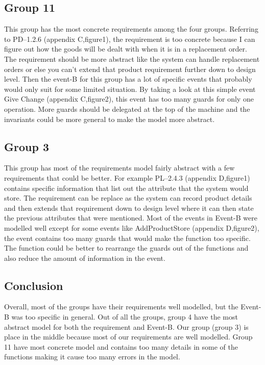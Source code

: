 \subsection{Group 11}
\label{group11}

This group has the most concrete requirements among the four groups. Referring to PD--1.2.6 (appendix C,figure1), the requirement is too concrete because I can figure out how the goods will be dealt with when it is in a replacement order. The requirement should be more abstract like the system can handle replacement orders or else you can’t extend that product requirement further down to design level. Then the event-B for this group has a lot of specific events that probably would only suit for some limited situation. By taking a look at this simple event Give Change (appendix C,figure2), this event has too many guards for only one operation. More guards should be delegated at the top of the machine and the invariants could be more general to make the model more abstract. 

\subsection{Group 3}
\label{group3}

This group has most of the requirements model fairly abstract with a few requirements that could be better. For example PL--2.4.3 (appendix D,figure1) contains specific information that list out the attribute that the system would store. The requirement can be replace as the system can record product details and then extends that requirement down to design level where it can then state the previous attributes that were mentioned. Most of the events in Event-B were modelled well except for some events like AddProductStore (appendix D,figure2), the event contains too many guards that would make the function too specific. The function could be better to rearrange the guards out of the functions and also reduce the amount of information in the event. 

\subsection{Conclusion}
\label{conclusion}

Overall, most of the groups have their requirements well modelled, but the Event-B was too specific in general. Out of all the groups, group 4 have the most abstract model for both the requirement and Event-B. Our group (group 3) is place in the middle because most of our requirements are well modelled. Group 11 have most concrete model and contains too many details in some of the functions making it cause too many errors in the model.


